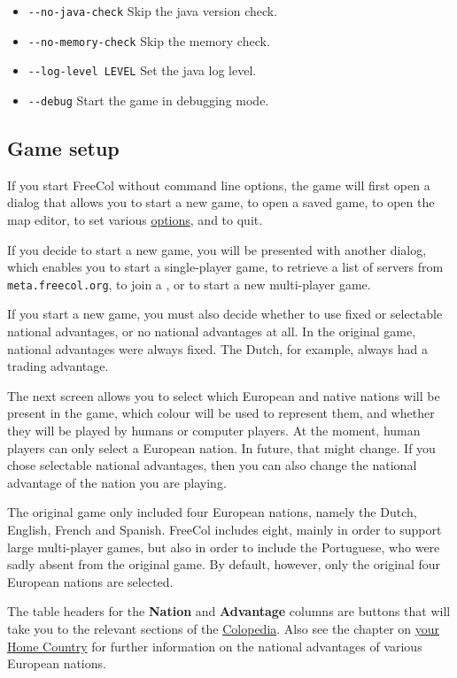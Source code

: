 \documentclass[12pt]{book}
\begin{document}
\begin{itemize}
\item\verb$--no-java-check$ Skip the java version check.
\item\verb$--no-memory-check$ Skip the memory check.
\item\verb$--log-level LEVEL$ Set the java log level.
\item\verb$--debug$ Start the game in debugging mode.
\end{itemize}


\hypertarget{Game setup}{\subsection{Game setup}}

If you start FreeCol without command line options, the game will first
open a dialog that allows you to start a new game, to open a saved
game, to open the map editor, to set various \hyperlink{Client
  options}{options}, and to quit.

If you decide to start a new game, you will be presented with another
dialog, which enables you to start a single-player game, to retrieve a
list of servers from \verb$meta.freecol.org$,
to join a , or to start a new multi-player
game.

If you start a new game, you must also decide whether to use fixed or
selectable national advantages, or no national advantages at all. In
the original game, national advantages were always fixed. The Dutch,
for example, always had a trading advantage.

The next screen allows you to select which European and native nations
will be present in the game, which colour will be used to represent
them, and whether they will be played by humans or computer
players. At the moment, human players can only select a European
nation. In future, that might change. If you chose selectable national
advantages, then you can also change the national advantage of the
nation you are playing.

The original game only included four European nations, namely the
Dutch, English, French and Spanish. FreeCol includes eight, mainly in
order to support large multi-player games, but also in order to
include the Portuguese, who were sadly absent from the original
game. By default, however, only the original four European nations are
selected.

The table headers for the {\bf Nation} and {\bf Advantage} columns are
buttons that will take you to the relevant sections of the
\hyperlink{Colopedia}{Colopedia}. Also see the chapter on
\hyperlink{Home Country}{your Home Country} for further information on
the national advantages of various European nations.
\end{document}
